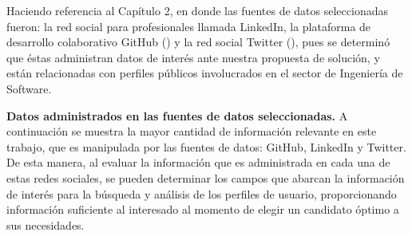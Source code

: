 Haciendo referencia al Capítulo 2, en donde las fuentes de datos seleccionadas fueron: la red social para profesionales llamada LinkedIn,  la plataforma de desarrollo colaborativo GitHub (\citeyear{fields_github}) y la red social Twitter (\citeyear{fields_twitter}), pues se determinó que éstas administran datos de interés ante nuestra propuesta de solución, y están relacionadas con perfiles públicos involucrados en el sector de Ingenier\'ia de Software. 

\textbf{Datos administrados en las fuentes de datos seleccionadas.}
A continuación se muestra la mayor cantidad de información relevante en este trabajo, que es manipulada por las fuentes de datos: GitHub, LinkedIn y Twitter. De esta manera, al evaluar la información que es administrada en cada una de estas redes sociales,  se pueden determinar los campos que abarcan la información de interés para la búsqueda y análisis de los perfiles de usuario, proporcionando información suficiente al interesado al momento de elegir un candidato óptimo a sus necesidades.

\renewcommand{\tablename}{Tabla}


